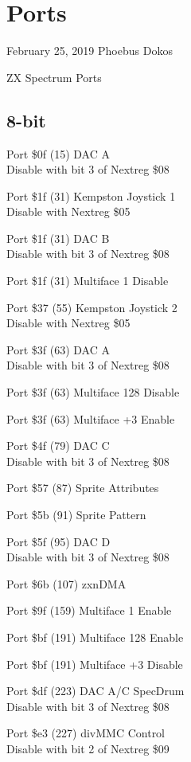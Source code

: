 \chapter{Ports}

February 25, 2019  Phoebus Dokos

\begin{table}[h]\centering\tiny
  \caption{ZX Spectrum Ports}
\end{table}

\section{8-bit}
Port \$0f (15) DAC A\\
Disable with bit 3 of Nextreg \$08

Port \$1f (31) Kempston Joystick 1\\
Disable with Nextreg \$05

Port \$1f (31) DAC B\\
Disable with bit 3 of Nextreg \$08

Port \$1f (31) Multiface 1 Disable

Port \$37 (55) Kempston Joystick 2\\
Disable with Nextreg \$05

Port \$3f (63) DAC A\\
Disable with bit 3 of Nextreg \$08

Port \$3f (63) Multiface 128 Disable

Port \$3f (63) Multiface +3 Enable

Port \$4f (79) DAC C\\
Disable with bit 3 of Nextreg \$08

Port \$57 (87) Sprite Attributes

Port \$5b (91) Sprite Pattern

Port \$5f (95) DAC D\\
Disable with bit 3 of Nextreg \$08

Port \$6b (107) zxnDMA

Port \$9f (159) Multiface 1 Enable

Port \$bf (191) Multiface 128 Enable

Port \$bf (191) Multiface +3 Disable

Port \$df (223) DAC A/C SpecDrum\\
Disable with bit 3 of Nextreg \$08

Port \$e3 (227) divMMC Control\\
Disable with bit 2 of Nextreg \$09

